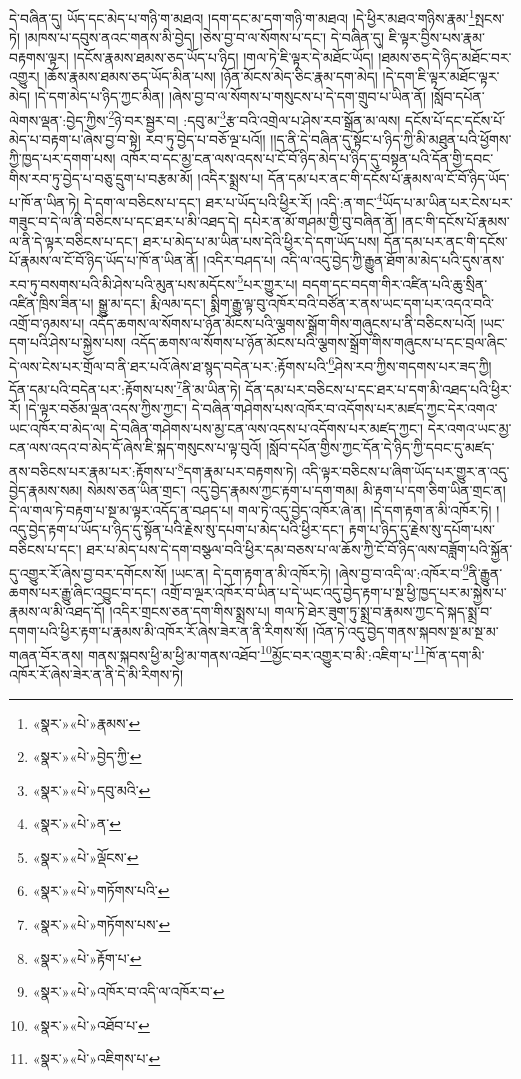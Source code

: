དེ་བཞིན་དུ། ཡོད་དང་མེད་པ་གཉི་ག་མཐའ། །དག་དང་མ་དག་གཉི་ག་མཐའ། །དེ་ཕྱིར་མཐའ་གཉིས་རྣམ་\footnote{«སྣར་»«པེ་»རྣམས་}སྤངས་ཏེ། །མཁས་པ་དབུས་ནའང་གནས་མི་བྱེད། །ཅེས་བྱ་བ་ལ་སོགས་པ་དང་། དེ་བཞིན་དུ། ཇི་ལྟར་བྱིས་པས་རྣམ་བརྟགས་ལྟར། །དངོས་རྣམས་ཐམས་ཅད་ཡོད་པ་ཉིད། །གལ་ཏེ་ཇི་ལྟར་དེ་མཐོང་ཡོད། །ཐམས་ཅད་དེ་ཉིད་མཐོང་བར་འགྱུར། །ཆོས་རྣམས་ཐམས་ཅད་ཡོད་མིན་པས། །ཉོན་མོངས་མེད་ཅིང་རྣམ་དག་མེད། །དེ་དག་ཇི་ལྟར་མཐོང་ལྟར་མེད། །དེ་དག་མེད་པ་ཉིད་ཀྱང་མིན། །ཞེས་བྱ་བ་ལ་སོགས་པ་གསུངས་པ་དེ་དག་གྲུབ་པ་ཡིན་ནོ། །སློབ་དཔོན་ལེགས་ལྡན་:བྱེད་ཀྱིས་\footnote{«སྣར་»«པེ་»བྱེད་ཀྱི་}ཉེ་བར་སྦྱར་བ། :དབུ་མ་\footnote{«སྣར་»«པེ་»དབུ་མའི་}རྩ་བའི་འགྲེལ་པ་ཤེས་རབ་སྒྲོན་མ་ལས། དངོས་པོ་དང་དངོས་པོ་མེད་པ་བརྟག་པ་ཞེས་བྱ་བ་སྟེ། རབ་ཏུ་བྱེད་པ་བཅོ་ལྔ་པའོ།། །།ད་ནི་དེ་བཞིན་དུ་སྟོང་པ་ཉིད་ཀྱི་མི་མཐུན་པའི་ཕྱོགས་ཀྱི་ཁྱད་པར་དགག་པས། འཁོར་བ་དང་མྱ་ངན་ལས་འདས་པ་ངོ་བོ་ཉིད་མེད་པ་ཉིད་དུ་བསྟན་པའི་དོན་གྱི་དབང་གིས་རབ་ཏུ་བྱེད་པ་བཅུ་དྲུག་པ་བརྩམ་མོ། །འདིར་སྨྲས་པ། དོན་དམ་པར་ནང་གི་དངོས་པོ་རྣམས་ལ་ངོ་བོ་ཉིད་ཡོད་པ་ཁོ་ན་ཡིན་ཏེ། དེ་དག་ལ་བཅིངས་པ་དང་། ཐར་པ་ཡོད་པའི་ཕྱིར་རོ། །འདི་:ན་གང་\footnote{«སྣར་»«པེ་»ན་}ཡོད་པ་མ་ཡིན་པར་ངེས་པར་གཟུང་བ་དེ་ལ་ནི་བཅིངས་པ་དང་ཐར་པ་མི་འཐད་དེ། དཔེར་ན་མོ་གཤམ་གྱི་བུ་བཞིན་ནོ། །ནང་གི་དངོས་པོ་རྣམས་ལ་ནི་དེ་ལྟར་བཅིངས་པ་དང་། ཐར་པ་མེད་པ་མ་ཡིན་པས་དེའི་ཕྱིར་དེ་དག་ཡོད་པས། དོན་དམ་པར་ནང་གི་དངོས་པོ་རྣམས་ལ་ངོ་བོ་ཉིད་ཡོད་པ་ཁོ་ན་ཡིན་ནོ། །འདིར་བཤད་པ། འདི་ལ་འདུ་བྱེད་ཀྱི་རྒྱུན་ཐོག་མ་མེད་པའི་དུས་ནས་རབ་ཏུ་བསགས་པའི་མི་ཤེས་པའི་མུན་པས་མདོངས་\footnote{«སྣར་»«པེ་»ལྡོངས་}པར་གྱུར་པ། བདག་དང་བདག་གིར་འཛིན་པའི་ཆུ་སྲིན་འཛིན་ཁྲིས་ཟིན་པ། སྒྱུ་མ་དང་། རྨི་ལམ་དང་། སྨིག་རྒྱུ་ལྟ་བུ་འཁོར་བའི་བཙོན་ར་ནས་ཡང་དག་པར་འདའ་བའི་འགྲོ་བ་ཉམས་པ། འདོད་ཆགས་ལ་སོགས་པ་ཉོན་མོངས་པའི་ལྕགས་སྒྲོག་གིས་གཞུངས་པ་ནི་བཅིངས་པའོ། །ཡང་དག་པའི་ཤེས་པ་སྐྱེས་པས། འདོད་ཆགས་ལ་སོགས་པ་ཉོན་མོངས་པའི་ལྕགས་སྒྲོག་གིས་གཞུངས་པ་དང་བྲལ་ཞིང་དེ་ལས་ངེས་པར་གྲོལ་བ་ནི་ཐར་པའོ་ཞེས་ཐ་སྙད་བདེན་པར་:རྟོགས་པའི་\footnote{«སྣར་»«པེ་»གཏོགས་པའི་}ཤེས་རབ་ཀྱིས་གདགས་པར་ཟད་ཀྱི། དོན་དམ་པའི་བདེན་པར་:རྟོགས་པས་\footnote{«སྣར་»«པེ་»གཏོགས་པས་}ནི་མ་ཡིན་ཏེ། དོན་དམ་པར་བཅིངས་པ་དང་ཐར་པ་དག་མི་འཐད་པའི་ཕྱིར་རོ། །དེ་ལྟར་བཅོམ་ལྡན་འདས་ཀྱིས་ཀྱང་། དེ་བཞིན་གཤེགས་པས་འཁོར་བ་འདོགས་པར་མཛད་ཀྱང་དེར་འགའ་ཡང་འཁོར་བ་མེད་ལ། དེ་བཞིན་གཤེགས་པས་མྱ་ངན་ལས་འདས་པ་འདོགས་པར་མཛད་ཀྱང་། དེར་འགའ་ཡང་མྱ་ངན་ལས་འདའ་བ་མེད་དོ་ཞེས་ཇི་སྐད་གསུངས་པ་ལྟ་བུའོ། །སློབ་དཔོན་གྱིས་ཀྱང་དོན་དེ་ཉིད་ཀྱི་དབང་དུ་མཛད་ནས་བཅིངས་པར་རྣམ་པར་:རྟོགས་པ་\footnote{«སྣར་»«པེ་»རྟོག་པ་}དག་རྣམ་པར་བརྟགས་ཏེ། འདི་ལྟར་བཅིངས་པ་ཞིག་ཡོད་པར་གྱུར་ན་འདུ་བྱེད་རྣམས་སམ། སེམས་ཅན་ཡིན་གྲང་། འདུ་བྱེད་རྣམས་ཀྱང་རྟག་པ་དག་གམ། མི་རྟག་པ་དག་ཅིག་ཡིན་གྲང་ན། དེ་ལ་གལ་ཏེ་བརྟག་པ་སྔ་མ་ལྟར་འདོད་ན་བཤད་པ། གལ་ཏེ་འདུ་བྱེད་འཁོར་ཞེ་ན། །དེ་དག་རྟག་ན་མི་འཁོར་ཏེ། །འདུ་བྱེད་རྟག་པ་ཡོད་པ་ཉིད་དུ་སྟོན་པའི་རྗེས་སུ་དཔག་པ་མེད་པའི་ཕྱིར་དང་། རྟག་པ་ཉིད་དུ་རྗེས་སུ་དཔོག་པས་བཅིངས་པ་དང་། ཐར་པ་མེད་པས་དེ་དག་བསྩལ་བའི་ཕྱིར་དམ་བཅས་པ་ལ་ཆོས་ཀྱི་ངོ་བོ་ཉིད་ལས་བཟློག་པའི་སྐྱོན་དུ་འགྱུར་རོ་ཞེས་བྱ་བར་དགོངས་སོ། །ཡང་ན། དེ་དག་རྟག་ན་མི་འཁོར་ཏེ། །ཞེས་བྱ་བ་འདི་ལ་:འཁོར་བ་\footnote{«སྣར་»«པེ་»འཁོར་བ་འདི་ལ་འཁོར་བ་}ནི་རྒྱུན་ཆགས་པར་རྒྱུ་ཞིང་འབྱུང་བ་དང་། འགྲོ་བ་ལྔར་འཁོར་བ་ཡིན་པ་དེ་ཡང་འདུ་བྱེད་རྟག་པ་སྔ་ཕྱི་ཁྱད་པར་མ་སྐྱེས་པ་རྣམས་ལ་མི་འཐད་དོ། །འདིར་གྲངས་ཅན་དག་གིས་སྨྲས་པ། གལ་ཏེ་ཐེར་ཟུག་ཏུ་སྨྲ་བ་རྣམས་ཀྱང་དེ་སྐད་སྨྲ་བ་དགག་པའི་ཕྱིར་རྟག་པ་རྣམས་མི་འཁོར་རོ་ཞེས་ཟེར་ན་ནི་རིགས་སོ། །འོན་ཏེ་འདུ་བྱེད་གནས་སྐབས་སྔ་མ་སྔ་མ་གཞན་བོར་ནས། གནས་སྐབས་ཕྱི་མ་ཕྱི་མ་གནས་འཐོབ་\footnote{«སྣར་»«པེ་»འཐོབ་པ་}མྱོང་བར་འགྱུར་བ་མི་:འཇིག་པ་\footnote{«སྣར་»«པེ་»འཇིགས་པ་}ཁོ་ན་དག་མི་འཁོར་རོ་ཞེས་ཟེར་ན་ནི་དེ་མི་རིགས་ཏེ། 